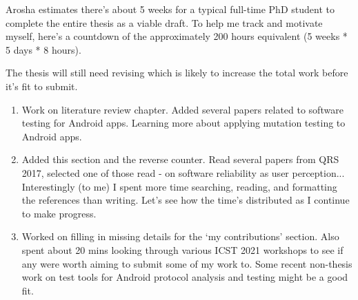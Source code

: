 Arosha estimates there's about 5 weeks for a typical full-time PhD student to complete the entire thesis as a viable draft. To help me track and motivate myself, here's a countdown of the approximately 200 hours equivalent (5 weeks * 5 days * 8 hours).

The thesis will still need revising which is likely to increase the total work before it's fit to submit.
\newcommand\reverselabel[1]{%
  \def\theenumi{}%
  \renewcommand\makelabel{\makebox[\dimexpr\labelwidth-3pt\relax][r]{%
    \the\numexpr#1-\value{enumi}+1\relax}}}%

\begin{enumerate}
    \reverselabel{200}
    \item Work on literature review chapter. Added several papers related to software testing for Android apps. Learning more about applying mutation testing to Android apps.
    \item Added this section and the reverse counter. Read several papers from QRS 2017, selected one of those read - on software reliability as user perception... Interestingly (to me) I spent more time searching, reading, and formatting the references than writing. Let's see how the time's distributed as I continue to make progress.
    \item Worked on filling in missing details for the `my contributions' section. Also spent about 20 mins looking through various ICST 2021 workshops to see if any were worth aiming to submit some of my work to. Some recent non-thesis work on test tools for Android protocol analysis and testing might be a good fit.
\end{enumerate}

